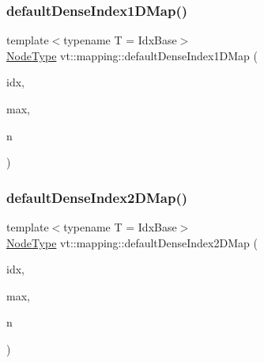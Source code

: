 \mbox{\label{namespacevt_1_1mapping_ae055a42b89a59fd6d0cc6d40f9abf3b5}} 
\subsubsection{\texorpdfstring{default\+Dense\+Index1\+D\+Map()}{defaultDenseIndex1DMap()}}
{\footnotesize\ttfamily template$<$typename T  = Idx\+Base$>$ \\
\hyperlink{namespacevt_a866da9d0efc19c0a1ce79e9e492f47e2}{Node\+Type} vt\+::mapping\+::default\+Dense\+Index1\+D\+Map (\begin{DoxyParamCaption}\item[{\hyperlink{namespacevt_1_1mapping_a8b576cf2f31069778e4951f64bccafd8}{Idx1\+D\+Ptr}$<$ T $>$}]{idx,  }\item[{\hyperlink{namespacevt_1_1mapping_a8b576cf2f31069778e4951f64bccafd8}{Idx1\+D\+Ptr}$<$ T $>$}]{max,  }\item[{\hyperlink{namespacevt_a866da9d0efc19c0a1ce79e9e492f47e2}{Node\+Type}}]{n }\end{DoxyParamCaption})}

\mbox{\label{namespacevt_1_1mapping_a011c4e2cb832d3edcd98e3803d405ad4}} 
\subsubsection{\texorpdfstring{default\+Dense\+Index2\+D\+Map()}{defaultDenseIndex2DMap()}}
{\footnotesize\ttfamily template$<$typename T  = Idx\+Base$>$ \\
\hyperlink{namespacevt_a866da9d0efc19c0a1ce79e9e492f47e2}{Node\+Type} vt\+::mapping\+::default\+Dense\+Index2\+D\+Map (\begin{DoxyParamCaption}\item[{\hyperlink{namespacevt_1_1mapping_a6832cbb1361fe72fd7ec730e7b7773b3}{Idx2\+D\+Ptr}$<$ T $>$}]{idx,  }\item[{\hyperlink{namespacevt_1_1mapping_a6832cbb1361fe72fd7ec730e7b7773b3}{Idx2\+D\+Ptr}$<$ T $>$}]{max,  }\item[{\hyperlink{namespacevt_a866da9d0efc19c0a1ce79e9e492f47e2}{Node\+Type}}]{n }\end{DoxyParamCaption})}

